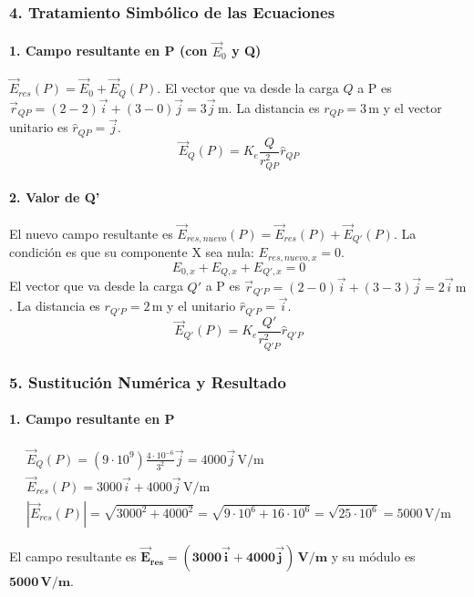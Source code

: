 \subsubsection*{4. Tratamiento Simbólico de las Ecuaciones}
\paragraph{1. Campo resultante en P (con $\vec{E}_0$ y Q)}
$\vec{E}_{res}(P) = \vec{E}_0 + \vec{E}_Q(P)$.
El vector que va desde la carga $Q$ a P es $\vec{r}_{QP} = (2-2)\vec{i} + (3-0)\vec{j} = 3\vec{j}\,\text{m}$.
La distancia es $r_{QP}=3\,\text{m}$ y el vector unitario es $\hat{r}_{QP}=\vec{j}$.
$$ \vec{E}_Q(P) = K_e \frac{Q}{r_{QP}^2} \hat{r}_{QP} $$
\paragraph{2. Valor de Q'}
El nuevo campo resultante es $\vec{E}_{res, nuevo}(P) = \vec{E}_{res}(P) + \vec{E}_{Q'}(P)$.
La condición es que su componente X sea nula: $E_{res, nuevo, x} = 0$.
$$ E_{0,x} + E_{Q,x} + E_{Q',x} = 0 $$
El vector que va desde la carga $Q'$ a P es $\vec{r}_{Q'P} = (2-0)\vec{i} + (3-3)\vec{j} = 2\vec{i}\,\text{m}$.
La distancia es $r_{Q'P}=2\,\text{m}$ y el unitario $\hat{r}_{Q'P}=\vec{i}$.
$$ \vec{E}_{Q'}(P) = K_e \frac{Q'}{r_{Q'P}^2}\hat{r}_{Q'P} $$

\subsubsection*{5. Sustitución Numérica y Resultado}
\paragraph{1. Campo resultante en P}
\begin{gather}
    \vec{E}_Q(P) = (9\cdot 10^9) \frac{4\cdot 10^{-6}}{3^2}\vec{j} = 4000\vec{j}\,\text{V/m} \\
    \vec{E}_{res}(P) = 3000\vec{i} + 4000\vec{j}\,\text{V/m} \\
    |\vec{E}_{res}(P)| = \sqrt{3000^2 + 4000^2} = \sqrt{9\cdot 10^6 + 16\cdot 10^6} = \sqrt{25\cdot 10^6} = 5000\,\text{V/m}
\end{gather}
\begin{cajaresultado}
El campo resultante es $\boldsymbol{\vec{E}_{res} = (3000\vec{i} + 4000\vec{j})\,\textbf{V/m}}$ y su módulo es $\boldsymbol{5000\,\textbf{V/m}}$.
\end{cajaresultado}
